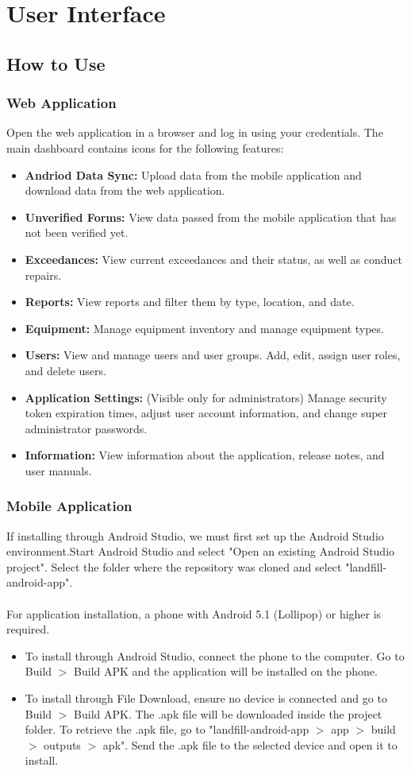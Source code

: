 \documentclass[12pt]{article}
\begin{document}
\section{User Interface}
\subsection{How to Use}
\subsubsection{Web Application}
Open the web application in a browser and log in using your credentials. The main dashboard contains icons for the following features:
\begin{itemize}
    \item \textbf{Andriod Data Sync:} Upload data from the mobile application and download data from the web application.
    \item \textbf{Unverified Forms:} View data passed from the mobile application that has not been verified yet.
    \item \textbf{Exceedances:} View current exceedances and their status, as well as conduct repairs.
    \item \textbf{Reports:} View reports and filter them by type, location, and date.
    \item \textbf{Equipment:} Manage equipment inventory and manage equipment types.
    \item \textbf{Users:} View and manage users and user groups. Add, edit, assign user roles, and delete users.
    \item \textbf{Application Settings:} (Visible only for administrators) Manage security token expiration times, adjust user account information, and change super administrator passwords.
    \item \textbf{Information:} View information about the application, release notes, and user manuals.
\end{itemize}
\subsubsection{Mobile Application}
If installing through Android Studio, we must first set up the Android Studio environment.Start Android Studio and select "Open an existing Android Studio project". Select the folder where the repository was cloned and select "landfill-android-app". \\\\
For application installation, a phone with Android 5.1 (Lollipop) or higher is required. 
\begin{itemize}
\item To install through Android Studio, connect the phone to the computer. Go to Build $>$ Build APK and the application will be installed on the phone. 
\item To install through File Download, ensure no device is connected and go to Build $>$ Build APK. The .apk file will be downloaded inside the project folder. To retrieve the .apk file, go to "landfill-android-app $>$ app $>$ build $>$ outputs $>$ apk". Send the .apk file to the selected device and open it to install.
\end{itemize}
\end{document}
